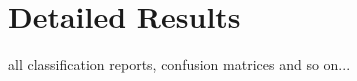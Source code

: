 \chapter{Detailed Results}
\label{app:detailed_results}

all classification reports, confusion matrices and so on...